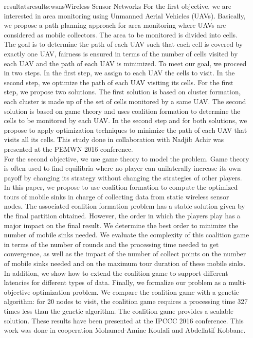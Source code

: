\documentclass{ra2016}
\begin{document}
\begin{module}{resultats}{results:wsns}{Wireless Sensor Networks}
For the first objective, we are interested in area monitoring using Unmanned Aerial Vehicles (UAVs). Basically, we propose a path planning approach for area monitoring where UAVs are considered as mobile collectors. The area to be monitored is divided into cells. The goal is to determine the path of each UAV such that each cell is covered by exactly one UAV, fairness is ensured in terms of the number of cells visited by each UAV and the path of each UAV is minimized. To meet our goal, we proceed in two steps. In the first step, we assign to each UAV the cells to visit. In the second step, we optimize the path of each UAV visiting its cells. For the first step, we propose two solutions. The first solution is based on cluster formation, each cluster is made up of the set of cells monitored by a same UAV. The second solution is based on game theory and uses coalition formation to determine the cells to be monitored by each UAV. In the second step and for both solutions, we propose to apply optimization techniques to minimize the path of each UAV that visits all its cells. This study done in collaboration with Nadjib Achir 
was presented at the PEMWN 2016 conference.\\

For the second objective, we use game theory to model the problem. Game theory is often used to find equilibria where no player can unilaterally increase its own payoff by changing its strategy without changing the strategies of other players. In this paper, we propose to use coalition formation to compute the optimized tours of mobile sinks in charge of collecting data from static wireless sensor nodes. The associated coalition formation problem has a stable solution given by the final partition obtained. However, the order in which the players play has a major impact on the final result. We determine the best order to minimize the number of mobile sinks needed.  We evaluate the complexity of this coalition game in terms of the number of rounds and the processing time needed to get convergence, as well as the impact of the number of collect points on the number of mobile sinks needed and on the maximum tour duration of these mobile sinks. In addition, we show how to extend the coalition game to support different latencies for different types of data. Finally, we formalize our problem as a multi-objective optimization problem. We compare the coalition game with a genetic algorithm: for 20 nodes to visit, the coalition game requires a processing time 327 times less than the genetic algorithm. The coalition game provides a scalable solution. These results have been presented at the IPCCC 2016 conference. This work 
was done in cooperation Mohamed-Amine Koulali and Abdellatif Kobbane.\\


\end{module}
\end{document}
